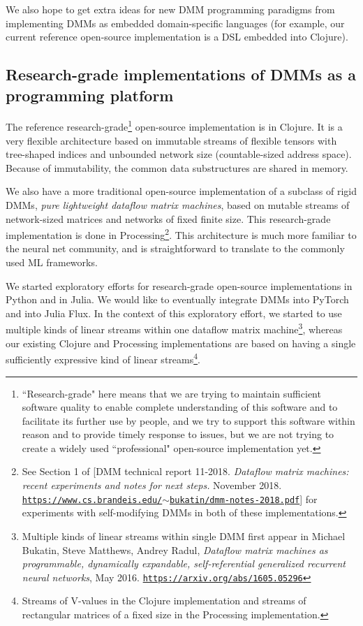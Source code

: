\documentclass{article}
\begin{document}
We also hope to get extra ideas for new DMM programming paradigms from implementing
DMMs as embedded domain-specific
languages (for example, our current reference open-source implementation is a DSL embedded into Clojure).

\subsection{Research-grade implementations of DMMs as a programming platform}

The reference research-grade\footnote{``Research-grade" here
means that we are trying to maintain sufficient software quality to enable complete understanding of this software
and to facilitate its further use by people, and we try to support this software within reason and to provide
timely response to issues, but we are not trying to create a widely used ``professional" 
open-source implementation yet.} open-source implementation is in Clojure. It is a very flexible architecture based
on immutable streams of flexible tensors with tree-shaped indices and unbounded network size
(countable-sized address space). Because of immutability, the common data substructures are shared in memory.

We also have a more traditional open-source implementation of a subclass of rigid DMMs, {\em pure lightweight dataflow matrix machines},
based on mutable streams of network-sized matrices and networks of fixed finite size. 
This research-grade implementation is done in Processing\footnote{See
Section 1 of [DMM technical report 11-2018. {\em Dataflow matrix machines: recent experiments and notes for next steps.} November 2018. \href{https://www.cs.brandeis.edu/~bukatin/dmm-notes-2018.pdf}
{\tt https://www.cs.brandeis.edu/$\sim$bukatin/dmm-notes-2018.pdf}]  
for experiments with self-modifying DMMs in both of these implementations.}. This architecture is much more
familiar to the neural net community, and is straightforward to translate to the commonly used ML frameworks.

We started exploratory efforts for research-grade open-source implementations in Python and in Julia. We
would like to eventually integrate DMMs into PyTorch and into Julia Flux. In the context of this exploratory effort,
we started to use multiple kinds of linear streams within one dataflow matrix machine\footnote{Multiple kinds 
of linear streams within single DMM first appear in Michael Bukatin, Steve Matthews, Andrey Radul,
{\em Dataflow matrix machines as programmable, dynamically expandable, self-referential 
generalized recurrent neural networks}, May 2016.
\href{https://arxiv.org/abs/1605.05296}{\tt https://arxiv.org/abs/1605.05296}}, 
whereas our existing Clojure and Processing implementations are based on having
a single sufficiently expressive kind of linear streams\footnote{Streams of V-values in the Clojure implementation
and streams of rectangular matrices of a fixed size in the Processing implementation.}.
\end{document}
